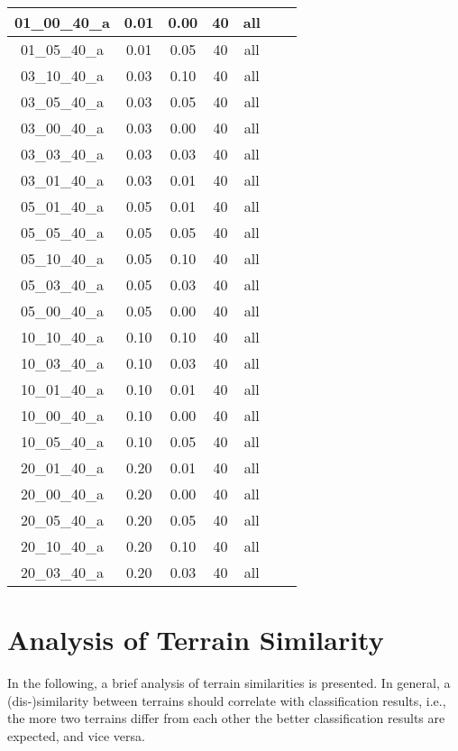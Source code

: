 \begin{table}[H]
\begin{tabular}{|c|c|c|c|c|c|c|}
01\_00\_40\_a	& 0.01	& 0.00	& 40	& all	 \\ \hline
01\_05\_40\_a	& 0.01	& 0.05	& 40	& all	 \\ \hline
03\_10\_40\_a	& 0.03	& 0.10	& 40	& all	 \\ \hline
03\_05\_40\_a	& 0.03	& 0.05	& 40	& all	 \\ \hline
03\_00\_40\_a	& 0.03	& 0.00	& 40	& all	 \\ \hline
03\_03\_40\_a	& 0.03	& 0.03	& 40	& all	 \\ \hline
03\_01\_40\_a	& 0.03	& 0.01	& 40	& all	 \\ \hline
05\_01\_40\_a	& 0.05	& 0.01	& 40	& all	 \\ \hline
05\_05\_40\_a	& 0.05	& 0.05	& 40	& all	 \\ \hline
05\_10\_40\_a	& 0.05	& 0.10	& 40	& all	 \\ \hline
05\_03\_40\_a	& 0.05	& 0.03	& 40	& all	 \\ \hline
05\_00\_40\_a	& 0.05	& 0.00	& 40	& all	 \\ \hline
10\_10\_40\_a	& 0.10	& 0.10	& 40	& all	 \\ \hline
10\_03\_40\_a	& 0.10	& 0.03	& 40	& all	 \\ \hline
10\_01\_40\_a	& 0.10	& 0.01	& 40	& all	 \\ \hline
10\_00\_40\_a	& 0.10	& 0.00	& 40	& all	 \\ \hline
10\_05\_40\_a	& 0.10	& 0.05	& 40	& all	 \\ \hline
20\_01\_40\_a	& 0.20	& 0.01	& 40	& all	 \\ \hline
20\_00\_40\_a	& 0.20	& 0.00	& 40	& all	 \\ \hline
20\_05\_40\_a	& 0.20	& 0.05	& 40	& all	 \\ \hline
20\_10\_40\_a	& 0.20	& 0.10	& 40	& all	 \\ \hline
20\_03\_40\_a	& 0.20	& 0.03	& 40	& all	 \\ \hline

\end{tabular}
\end{table}

\section{Analysis of Terrain Similarity} \label{sec:terrains_analysis}
In the following, a brief analysis of terrain similarities is presented. In general, a (dis-)similarity between terrains should correlate with classification results, i.e., the more two terrains differ from each other the better classification results are expected, and vice versa.

